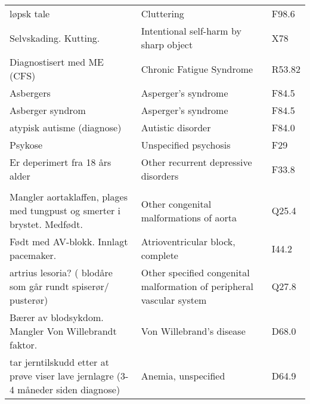 \begin{table}[H]
{\begin{tabular}{|lll|}
		\hline

        \rowcolor[HTML]{FFD1AA}        
		\multicolumn{3}{|l|}{Psychological / Psychiatric}   \\
		\hline   		

		løpsk tale                     & Cluttering                            & F98.6 \\		
		Selvskading. Kutting.          & Intentional self-harm by sharp object & X78 \\
		Diagnostisert med ME (CFS)     & Chronic Fatigue Syndrome              & R53.82 \\
        Asbergers                      & Asperger's syndrome                   & F84.5 \\        
        Asberger syndrom               & Asperger's syndrome                   & F84.5 \\                
        atypisk autisme (diagnose)     & Autistic disorder                     & F84.0 \\		        
        Psykose                        & Unspecified psychosis                 & F29   \\ 
        Er deperimert fra 18 års alder & Other recurrent depressive disorders  & F33.8  \\ 

		\hline

        \rowcolor[HTML]{FFD1AA}        
		\multicolumn{3}{|l|}{Heart and blood}   \\
		\hline   		
        
        Mangler aortaklaffen, plages med tungpust og smerter i brystet. Medfødt.          & Other congenital malformations of aorta & Q25.4 \\		
		Født med AV-blokk. Innlagt pacemaker.                                             & Atrioventricular block, complete        & I44.2 \\
		artrius lesoria? ( blodåre som går rundt spiserør/ pusterør)                      & Other specified congenital malformation of peripheral vascular system & Q27.8 \\
        Bærer av blodsykdom. Mangler Von Willebrandt faktor.                              & Von Willebrand's disease                & D68.0 \\        
        tar jerntilskudd etter at prøve viser lave jernlagre (3-4 måneder siden diagnose) & Anemia, unspecified                     & D64.9 \\		        
        
		\hline        


\end{tabular}}
\end{table}
